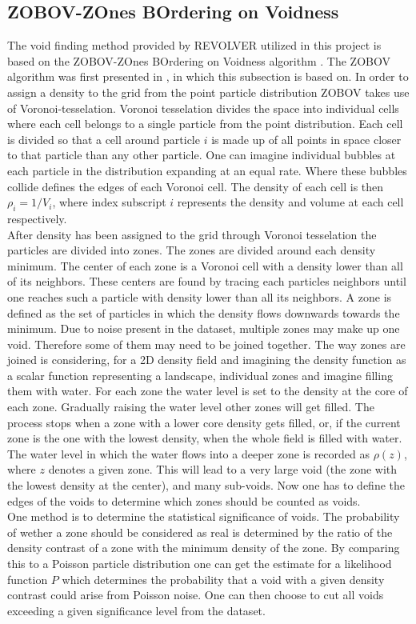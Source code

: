 \subsection{ZOBOV-ZOnes BOrdering on Voidness}
The void finding method provided by REVOLVER utilized in this project is based
on the ZOBOV-ZOnes BOrdering on Voidness algorithm . The ZOBOV algorithm was
first presented in \cite{Neyrinck_2008}, in which this subsection is based on. In
order to assign a density to the grid from the point particle distribution ZOBOV
takes use of Voronoi-tesselation. Voronoi tesselation divides the space into
individual cells where each cell belongs to a single particle from the point
distribution. Each cell is divided so that a cell around particle $i$ is made up of all
points in space closer to that particle than any other particle. One can imagine
individual bubbles at each particle in the distribution expanding at an equal
rate. Where these bubbles collide defines the edges of each Voronoi cell. The
density of each cell is then $\rho_i=1/V_i$, where index subscript $i$ represents the
density and volume at each cell respectively.\\

After density has been assigned to
the grid through Voronoi tesselation the particles are divided into zones. The
zones are divided around each density minimum. The center of each zone is a
Voronoi cell with a density lower than all of its neighbors. These centers are
found by tracing each particles neighbors until one reaches such a particle with
density lower than all its neighbors. A zone is defined as the set of particles in
which the density flows downwards towards the minimum. Due to noise present in the
dataset, multiple zones may make up one void. Therefore some of them may need to
be joined together. The way zones are joined is considering, for a 2D density
field and imagining the density function as a scalar function representing a
landscape, individual zones and imagine filling them with water. For each zone
the water level is set to the density at the core of each zone. Gradually
raising the water level other zones will get filled. The process stops when a
zone with a lower core density gets filled, or, if the current zone is the one
with the lowest density, when the whole field is filled with water. The water
level in which the water flows into a deeper zone is recorded as $\rho(z)$, where $z$ denotes a given zone. This will lead to
a very large void (the zone with the lowest density at the center), and many
sub-voids. Now one has to define the edges of the voids to determine which zones
should be counted as voids.
\\\indent
One method is to determine the statistical significance of voids. The
probability of wether a zone should be considered as real is determined by the
ratio of the density contrast of a zone with the minimum density of the zone. By
comparing this to a Poisson particle distribution one can get the estimate for a
likelihood function $P$ which determines the probability that a void with a
given density contrast could arise from Poisson noise. One can then choose to
cut all voids exceeding a given significance level from the dataset.
